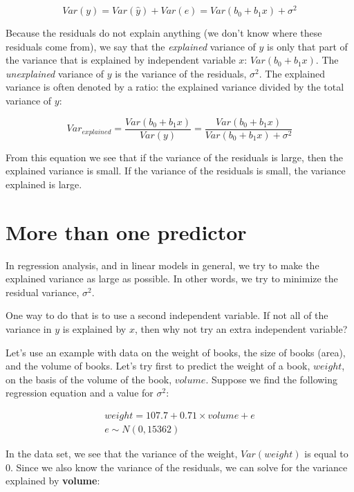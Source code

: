 \documentclass[]{book}\usepackage[]{graphicx}\usepackage[]{color}
\begin{document}
\begin{equation}
Var(y) = Var(\hat{y}) + Var(e) = Var(b_0 + b_1 x) + \sigma^2
\end{equation}


Because the residuals do not explain anything (we don't know where these residuals come from), we say that the \textit{explained} variance of $y$ is only that part of the variance that is explained by independent variable $x$: $Var(b_0 + b_1 x)$. The \textit{unexplained} variance of $y$ is the variance of the residuals, $\sigma^2$. The explained variance is often denoted by a ratio: the explained variance divided by the total variance of $y$:


\begin{equation}
Var_{explained} = \frac{Var(b_0+b_1 x)}{Var(y)} = \frac{Var(b_0+b_1 x)}{Var(b_0+b_1 x) + \sigma^2}
\end{equation}

From this equation we see that if the variance of the residuals is large, then the explained variance is small. If the variance of the residuals is small, the variance explained is large.


\section{More than one predictor}

In regression analysis, and in linear models in general, we try to make the explained variance as large as possible. In other words, we try to minimize the residual variance, $\sigma^2$.

One way to do that is to use a second independent variable. If not all of the variance in $y$ is explained by $x$, then why not try an extra independent variable?


Let's use an example with data on the weight of books, the size of books (area), and the volume of books. Let's try first to predict the weight of a book, $weight$, on the basis of the volume of the book, $volume$. Suppose we find the following regression equation and a value for $\sigma^2$:






\begin{eqnarray}
weight = 107.7 + 0.71 \times  volume + e \\
e \sim N(0, 15362)
\end{eqnarray}


In the data set, we see that the variance of the weight, $Var(weight)$ is equal to 0. Since we also know the variance of the residuals, we can solve for the variance explained by \textbf{volume}:
\end{document}
